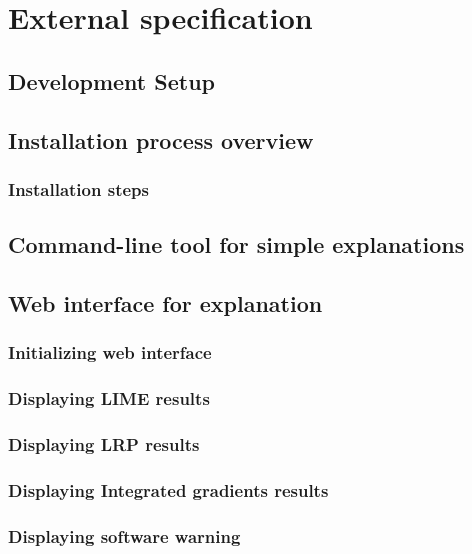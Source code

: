 \documentclass[
    bindingoffset=5mm,  %
    footnoteindent=3mm, %
    hyphenation=true    %
]{src/wut-thesis}
\begin{document}
%
%
\clearpage %
\section{External specification} \label{ch:externalSpec}

\subsection{Development Setup} \label{ch4:DevelopmentSetup}
\subsection{Installation process overview}
\subsubsection{Installation steps}

\subsection{Command-line tool for simple explanations} \label{ch4:CmdTool}

\subsection{Web interface for explanation}
\subsubsection{Initializing web interface}
\subsubsection{Displaying LIME results}
\subsubsection{Displaying LRP results}
\subsubsection{Displaying Integrated gradients results}
\subsubsection{Displaying software warning} \label{ch4:NotificationPanel}
\end{document}

